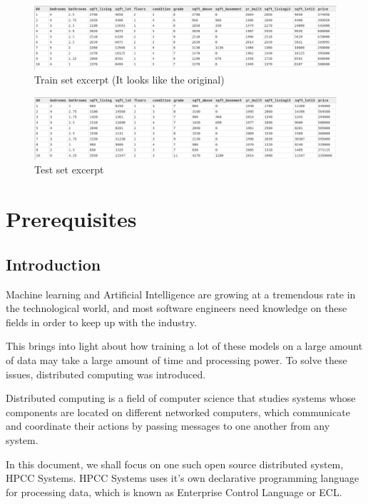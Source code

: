 \documentclass[a4paper,oneside,12pt]{book}
\begin{document}
\begin{figure}[h]
    \centering
    \includegraphics[width=\linewidth]{../output/55/train}
    \caption{Train set excerpt (It looks like the original)}
\end{figure}

\begin{figure}[h]
    \centering
    \includegraphics[width=\linewidth]{../output/55/test}
    \caption{Test set excerpt}
\end{figure}


\part{Prerequisites}\label{part:prereqs}

\chapter{Introduction}\label{chap:intro}

Machine learning and Artificial Intelligence are growing at a tremendous rate in the technological world, and most software engineers need knowledge on these fields in order to keep up with the industry.

This brings into light about how training a lot of these models on a large amount of data may take a large amount of time and processing power. To solve these issues, distributed computing was introduced.

Distributed computing is a field of computer science that studies systems whose components are located on different networked computers, which communicate and coordinate their actions by passing messages to one another from any system.

In this document, we shall focus on one such open source distributed system, HPCC Systems. HPCC Systems uses it's own declarative programming language for processing data, which is known as Enterprise Control Language or ECL.
\end{document}
